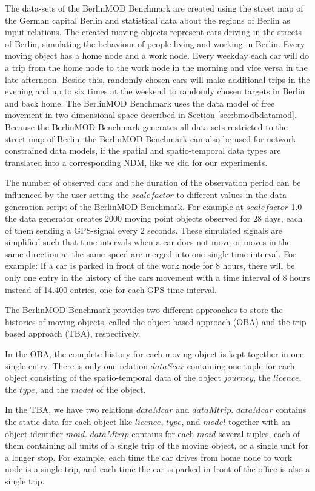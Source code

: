 \documentclass[a4paper]{article}
\newcommand{\bmodb} {BerlinMOD Benchmark}
\begin{document}
{The data-sets of the \bmodb{} are created using the street map of the German
capital Berlin \cite{bbike} and statistical data about the regions of Berlin
\cite{bevberlin,berlinstadtatlas} as input relations.
The created moving objects represent cars driving in the streets of Berlin,
simulating the behaviour of people living and working in Berlin.
Every moving object has a home node and a work node. Every weekday each car will
do a trip from the home node to the work node in the morning and vice versa
in the late afternoon. Beside this, randomly chosen cars will make additional
trips in the evening and up to six times at the weekend to randomly chosen
targets in Berlin and back home. The \bmodb{} uses the data model of free movement in two
dimensional space described in Section \ref{sec:bmodbdatamod}. Because the \bmodb{}
generates all data sets restricted to the street map of Berlin, the \bmodb{} can
also be used for network constrained data models, if the spatial and spatio-temporal
data types are translated into a corresponding NDM, like we did
for our experiments.

The number of observed cars and the duration of the observation period can be
influenced by the user setting the $scalefactor$ to different values in the data
generation script of the \bmodb{}. For example at $scalefactor$ 1.0 the data generator
creates 2000 moving point objects observed for 28 days, each of them sending a
GPS-signal every 2 seconds. These simulated signals are simplified such that time
intervals when a car does not move or moves in the same direction at the same
speed are merged into one single time interval. For example: If a car is parked in front
of the work node for 8 hours, there will be only one entry in the history of the
cars movement with a time interval of 8 hours instead of 14.400 entries,
one for each GPS time interval.

The \bmodb{} provides two different approaches to store the histories of moving
objects, called the object-based approach (OBA) and the trip based approach (TBA),
respectively.

In the OBA, the complete history for each moving object is kept together in one
single entry. There is only one relation $dataScar$
containing one tuple for each object consisting of the spatio-temporal data of
the object $journey$, the $licence$, the $type$, and the $model$ of the object.

In the TBA, we have two relations $dataMcar$ and $dataMtrip$. $dataMcar$ contains
the static data for each object like $licence$, $type$, and $model$ together with
an object identifier $moid$. $dataMtrip$ contains for each $moid$ several tuples,
each of them containing all units of a single trip of the moving object, or a
single unit for a longer stop. For example, each time the car drives from home node
to work node is a single trip, and each time the car is parked in front of the office
is also a single trip.

}
\end{document}
